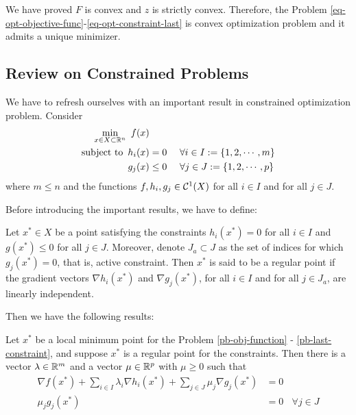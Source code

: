 \documentclass{article}
\begin{document}
We have proved $ F $ is convex and $ z $ is strictly convex. Therefore, the Problem \ref{eq-opt-objective-func}-\ref{eq-opt-constraint-last} is convex optimization problem and it admits a unique minimizer.

\subsection{Review on Constrained Problems}

We have to refresh ourselves with an important result in constrained optimization problem. Consider
\begin{align} \label{pb-obj-function}
    \min_{x \in X \subset \mathbb{R}^n}~ f(x) & \\ 
    \operatorname{subject~to}~ h_i (x) &= 0 ~~~~ \forall i \in I := \{1, 2, \cdots, m\} \\
    g_j (x) &\le 0 ~~~~ \forall j \in J := \{1, 2, \cdots, p\} \label{pb-last-constraint}
\end{align}
where $ m \le n $ and the functions $ f, h_i, g_j \in \mathcal{C}^1(X) $ for all $ i \in I $ and for all $ j \in J $. 

Before introducing the important results, we have to define:

\begin{defi}  
    Let $ x^* \in X $ be a point satisfying the constraints $ h_i (x^*) = 0 $ for all $ i \in I $ and $ g(x^*) \le 0 $ for all $ j \in J $. Moreover, denote $ J_a \subset J $ as the set of indices for which $ g_j (x^*) = 0 $, that is, active constraint. Then $ x^* $ is said to be a regular point if the gradient vectors $ \nabla h_i (x^*) $ and $ \nabla g_j (x^*) $, for all $ i \in I $ and for all $ j \in J_a $, are linearly independent.
\end{defi}

Then we have the following results:

\begin{theo} Let $ x^* $ be a local minimum point for the Problem \ref{pb-obj-function} - \ref{pb-last-constraint}, and suppose $ x^* $ is a regular point for the constraints. Then there is a vector $ \lambda \in \mathbb{R}^m $ and a vector $ \mu \in \mathbb{R} ^p $ with $ \mu \ge 0 $ such that
\begin{align*}
    \nabla f (x^*) + \sum_{i \in I} \lambda_i \nabla h_i (x^*) + \sum_{j \in J} \mu_j \nabla g_j (x^*) &= 0 \\ 
    \mu_j g_j(x^*) &= 0 ~~~~ \forall j \in J
\end{align*}
\end{theo}
\end{document}
